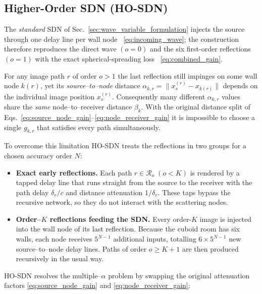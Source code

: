 \documentclass[journal]{IEEEtran}
\begin{document}
\subsection{Higher-Order SDN (HO-SDN)}
The \emph{standard} SDN of Sec.~\ref{sec:wave_variable_formulation}
injects the source through one delay line per wall node
~\eqref{eq:incoming_wave}; the construction therefore reproduces
the direct wave \((o = 0)\) and the six first-order reflections
\((o = 1)\) with the exact spherical-spreading loss ~\eqref{eq:combined_gain}.

For any image path \(r\) of order \(o > 1\) the last reflection still
impinges on some wall node \(k(r)\), yet its
\emph{source–to–node} distance  
\(\alpha_{k,r} = \lVert x_s^{(r)} - x_{k(r)} \rVert\)
depends on the individual image position \(x_s^{(r)}\).
Consequently many different \(\alpha_{k,r}\) values share the
\emph{same} node–to–receiver distance \(\beta_k\).
With the original distance split of
Eqs.~\eqref{eq:source_node_gain}–\eqref{eq:node_receiver_gain} it is
impossible to choose a single \(g_{k,r}\) that satisfies every path
simultaneously.

To overcome this limitation HO-SDN treats the reflections in two
groups for a chosen accuracy order \(N\):

\begin{itemize}
\item \textbf{Exact early reflections.}\;
      Each path \(r \in \mathcal{R}_o\;(o < K)\) is rendered by a tapped
      delay line that runs straight from the source to the receiver with
      the path delay \(\delta_r/c\) and distance attenuation \(1/\delta_r\).  
      These taps bypass the recursive network, so they do not interact
      with the scattering nodes.

\item \textbf{Order–\(K\) reflections feeding the SDN.}\;
      Every order-\(K\) image is injected into the wall node of its last
      reflection.  Because the cuboid room has six walls, each node
      receives \(5^{N-1}\) additional inputs, totalling
      \(6 \times 5^{N-1}\) new source–to–node delay lines.  
      Paths of order \(o \ge K+1\) are then produced recursively in the
      usual way.
\end{itemize}

HO-SDN resolves the multiple–\(\alpha\) problem by swapping the
original attenuation factors \eqref{eq:source_node_gain} and \eqref{eq:node_receiver_gain}:
\end{document}
